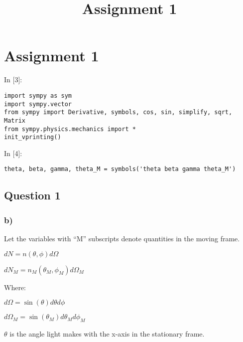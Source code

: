 \documentclass[11pt]{article}
\title{Assignment 1}
\newif\ifcode
\newif\ifleftmargins
\newlength{\promptlength}
\newcommand{\prompt}[3]{
        \needspace{1.1cm}
        \settowidth{\promptlength}{ #1 [#3] }
        \ifleftmargins\hspace{-\promptlength}\hspace{-5pt}\fi
        {\color{#2}#1 [#3]:}
        \ifleftmargins\vspace{-2.7ex}\fi
    }
\begin{document}
    
    
    
    
    

    
    \hypertarget{assignment-1}{%
\section{Assignment 1}\label{assignment-1}}

    
\prompt{In}{incolor}{3}
\codetrue
\begin{tcolorbox}[breakable, size=fbox, boxrule=1pt, pad at break*=1mm, colback=cellbackground, colframe=cellborder]
\begin{verbatim}
import sympy as sym 
import sympy.vector
from sympy import Derivative, symbols, cos, sin, simplify, sqrt, Matrix
from sympy.physics.mechanics import *
init_vprinting()
\end{verbatim}
\end{tcolorbox}
\codefalse

    
\prompt{In}{incolor}{4}
\codetrue
\begin{tcolorbox}[breakable, size=fbox, boxrule=1pt, pad at break*=1mm, colback=cellbackground, colframe=cellborder]
\begin{verbatim}
theta, beta, gamma, theta_M = symbols('theta beta gamma theta_M')
\end{verbatim}
\end{tcolorbox}
\codefalse

    \hypertarget{question-1}{%
\subsection{Question 1}\label{question-1}}

\hypertarget{b}{%
\subsubsection{b)}\label{b}}

Let the variables with ``M'' subscripts denote quantities in the moving
frame.

\(dN = n(\theta, \phi) d\Omega\)

\(dN_M = n_M(\theta_M, \phi_M) d\Omega_M\)

Where:

\(d\Omega = \sin(\theta) d\theta d\phi\)

\(d\Omega_M = \sin(\theta_M) d\theta_M d\phi_M\)

\(\theta\) is the angle light makes with the x-axis in the stationary
frame.
\end{document}
